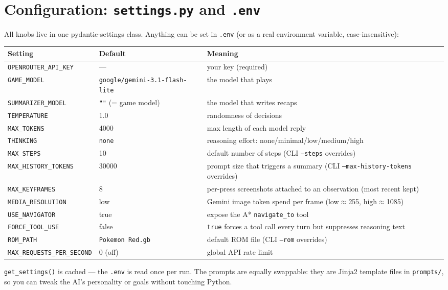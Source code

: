 \documentclass[11pt]{article}
\newcommand{\code}[1]{\texttt{#1}}
\begin{document}
\section{Configuration: \code{settings.py} and \code{.env}}

All knobs live in one pydantic-settings class. Anything can be set in \code{.env} (or as a real environment variable, case-insensitive):

\begin{tabularx}{\textwidth}{@{}llX@{}}
\toprule
\textbf{Setting} & \textbf{Default} & \textbf{Meaning} \\
\midrule
\code{OPENROUTER\_API\_KEY} & --- & your key (required) \\
\code{GAME\_MODEL} & \code{google/gemini-3.1-flash-lite} & the model that plays \\
\code{SUMMARIZER\_MODEL} & \code{""} (= game model) & the model that writes recaps \\
\code{TEMPERATURE} & 1.0 & randomness of decisions \\
\code{MAX\_TOKENS} & 4000 & max length of each model reply \\
\code{THINKING} & \code{none} & reasoning effort: none/minimal/low/medium/high \\
\code{MAX\_STEPS} & 10 & default number of steps (CLI \code{--steps} overrides) \\
\code{MAX\_HISTORY\_TOKENS} & 30000 & prompt size that triggers a summary (CLI \code{--max-history-tokens} overrides) \\
\code{MAX\_KEYFRAMES} & 8 & per-press screenshots attached to an observation (most recent kept) \\
\code{MEDIA\_RESOLUTION} & low & Gemini image token spend per frame (low$\approx$255, high$\approx$1085) \\
\code{USE\_NAVIGATOR} & true & expose the A* \code{navigate\_to} tool \\
\code{FORCE\_TOOL\_USE} & false & \code{true} forces a tool call every turn but suppresses reasoning text \\
\code{ROM\_PATH} & \code{Pokemon Red.gb} & default ROM file (CLI \code{--rom} overrides) \\
\code{MAX\_REQUESTS\_PER\_SECOND} & 0 (off) & global API rate limit \\
\bottomrule
\end{tabularx}

\vspace{0.5em}
\code{get\_settings()} is cached --- the \code{.env} is read once per run. The prompts are equally swappable: they are Jinja2 template files in \code{prompts/}, so you can tweak the AI's personality or goals without touching Python.
\end{document}
